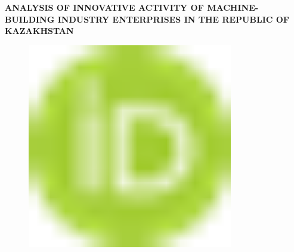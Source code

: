 
{\bfseries ANALYSIS OF INNOVATIVE ACTIVITY OF MACHINE-BUILDING INDUSTRY
ENTERPRISES IN THE REPUBLIC OF KAZAKHSTAN}

\begin{figure}[H]
	\centering
	\includegraphics[width=0.8\textwidth]{media/ekon/image1}
	\caption*{}
\end{figure}

